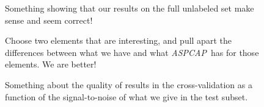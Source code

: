 \documentclass[12pt,preprint]{aastex}
\newcommand{\project}[1]{\textsl{#1}}
\newcommand{\acronym}[1]{{\small{#1}}}
\newcommand{\aspcap}{\project{\acronym{ASPCAP}}}
\begin{document}
\begin{figure}[p]
\caption{Something showing that our results on the full unlabeled set
  make sense and seem correct!\label{fig:fulltest}}
\end{figure}

\begin{figure}[p]
\caption{Choose two elements that are interesting, and pull apart the
  differences between what we have and what \aspcap\ has for those
  elements.  We are better!\label{fig:elements}}
\end{figure}

\begin{figure}[p]
\caption{Something about the quality of results in the
  cross-validation as a function of the signal-to-noise of what we
  give in the test subset.\label{fig:snr}}
\end{figure}
\end{document}
